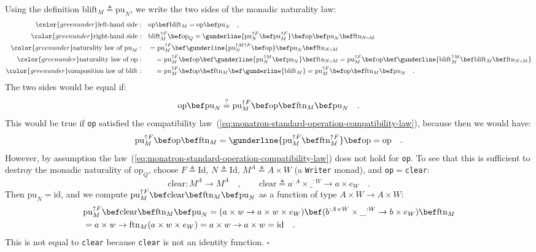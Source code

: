 Using the definition $\text{blift}_{M}\triangleq\text{pu}_{N}$, we
write the two sides of the monadic naturality law:
\begin{align*}
{\color{greenunder}\text{left-hand side}:}\quad & \text{op}\bef\text{blift}_{M}=\text{op}\bef\text{pu}_{N}\quad,\\
{\color{greenunder}\text{right-hand side}:}\quad & \text{blift}_{M}^{\uparrow F}\bef\text{op}_{Q}=\gunderline{\text{pu}_{N}^{\uparrow F}\bef\text{pu}_{M}^{\uparrow F}}\bef\text{op}\bef\text{pu}_{N}\bef\text{ftn}_{N\circ M}\\
{\color{greenunder}\text{naturality law of }\text{pu}_{M}:}\quad & =\text{pu}_{M}^{\uparrow F}\bef\gunderline{\text{pu}_{N}^{\uparrow M\uparrow F}\bef\text{op}}\bef\text{pu}_{N}\bef\text{ftn}_{N\circ M}\\
{\color{greenunder}\text{naturality law of }\text{op}:}\quad & \quad=\text{pu}_{M}^{\uparrow F}\bef\text{op}\bef\gunderline{\text{pu}_{N}^{\uparrow M}\bef\text{pu}_{N}}\bef\text{ftn}_{N\circ M}=\text{pu}_{M}^{\uparrow F}\bef\text{op}\bef\gunderline{\text{blift}_{M}^{\uparrow M}\bef\text{blift}_{M}\bef\text{ftn}_{N\circ M}}\\
{\color{greenunder}\text{composition law of }\text{blift}:}\quad & \quad=\text{pu}_{M}^{\uparrow F}\bef\text{op}\bef\text{ftn}_{M}\bef\gunderline{\text{blift}_{M}}=\text{pu}_{M}^{\uparrow F}\bef\text{op}\bef\text{ftn}_{M}\bef\text{pu}_{N}\quad.
\end{align*}
The two sides would be equal if:
\[
\text{op}\bef\text{pu}_{N}\overset{?}{=}\text{pu}_{M}^{\uparrow F}\bef\text{op}\bef\text{ftn}_{M}\bef\text{pu}_{N}\quad.
\]
This would be true if \lstinline!op! satisfied the compatibility
law~(\ref{eq:monatron-standard-operation-compatibility-law}), because
then we would have:
\[
\text{pu}_{M}^{\uparrow F}\bef\text{op}\bef\text{ftn}_{M}=\gunderline{\text{pu}_{M}^{\uparrow F}\bef\text{ftn}_{M}^{\uparrow F}}\bef\text{op}=\text{op}\quad.
\]
However, by assumption the law~(\ref{eq:monatron-standard-operation-compatibility-law})
does not hold for \lstinline!op!. To see that this is sufficient
to destroy the monadic naturality of $\text{op}_{Q}$, choose $F\triangleq\text{Id}$,
$N\triangleq\text{Id}$, $M^{A}\triangleq A\times W$ (a \lstinline!Writer!
monad), and \lstinline!op!$=$\lstinline!clear!:
\[
\text{clear}:M^{A}\rightarrow M^{A}\quad,\quad\quad\text{clear}\triangleq a^{:A}\times\_^{:W}\rightarrow a\times e_{W}\quad.
\]
Then $\text{pu}_{N}=\text{id}$, and we compute $\text{pu}_{M}^{\uparrow F}\bef\text{clear}\bef\text{ftn}_{M}\bef\text{pu}_{N}$
as a function of type $A\times W\rightarrow A\times W$:
\begin{align*}
 & \text{pu}_{M}^{\uparrow F}\bef\text{clear}\bef\text{ftn}_{M}\bef\text{pu}_{N}=(a\times w\rightarrow a\times w\times e_{W})\bef(b^{:A\times W}\times\_^{:W}\rightarrow b\times e_{W})\bef\text{ftn}_{M}\\
 & =a\times w\rightarrow\text{ftn}_{M}(a\times w\times e_{W})=a\times w\rightarrow a\times w=\text{id}\quad.
\end{align*}
This is not equal to \lstinline!clear! because \lstinline!clear!
is not an identity function. $\square$

